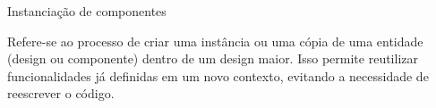 \documentclass[aspectratio=169]{beamer}
\begin{document}
%	
%	
%	
%	
%	
%	
%	
%	
%	
%	
%	
%	
%	
%	


	
	
\begin{frame}{Instanciação de componentes}
	\justifying
	
	\begin{block}{}
		Refere-se ao processo de criar uma instância ou uma cópia de uma entidade (design ou componente) dentro de um design maior. Isso permite reutilizar funcionalidades já definidas em um novo contexto, evitando a necessidade de reescrever o código.
		
	\end{block}
	
	
\end{frame}
	
\end{document}

